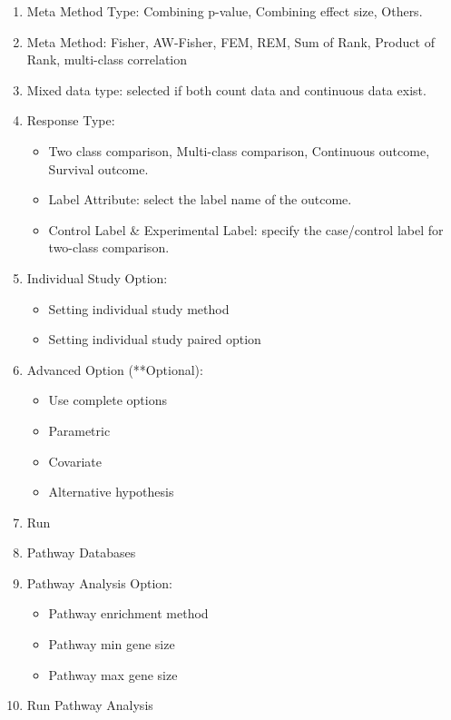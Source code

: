 \begin{enumerate}
  \item Meta Method Type: Combining p-value, Combining effect size, Others.
  \item Meta Method: Fisher, AW-Fisher, FEM, REM, Sum of Rank, Product of Rank, multi-class correlation 
  \item Mixed data type: selected if both count data and continuous data exist.
  \item Response Type:
   \begin{itemize}
     \item Two class comparison, Multi-class comparison, Continuous outcome, Survival outcome.
     \item Label Attribute: select the label name of the outcome.
     \item Control Label \& Experimental Label: specify the case/control label for two-class comparison.
    \end{itemize}
   \item Individual Study Option:
     \begin{itemize}
     \item Setting individual study method
     \item Setting individual study paired option
    \end{itemize} 
   \item Advanced Option (**Optional):
     \begin{itemize}
      \item Use complete options
      \item Parametric
      \item Covariate
      \item Alternative hypothesis
    \end{itemize} 
    \item Run
    \item Pathway Databases
    \item Pathway Analysis Option:
         \begin{itemize}
      \item Pathway enrichment method
      \item Pathway min gene size
      \item Pathway max gene size
    \end{itemize} 
    \item Run Pathway Analysis
\end{enumerate}




